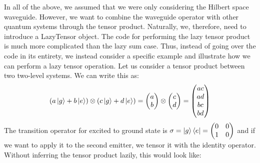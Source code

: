 In all of the above, we assumed that we were only considering the Hilbert space waveguide. However, we want to combine the waveguide operator with other quantum systems through the tensor product. Naturally, we, therefore, need to introduce a LazyTensor object. The code for performing the lazy tensor product is much more complicated than the lazy sum case. Thus, instead of going over the code in its entirety, we instead consider a specific example and illustrate how we can perform a lazy tensor operation. Let us consider a tensor product between two two-level systems. We can write this as:
\begin{equation}
    \left (a\ket{g}+b\ket{e} \right ) \otimes \left(c\ket{g}+d\ket{e} \right) =  \begin{pmatrix} {a} \\ {b} \end{pmatrix} \otimes \begin{pmatrix} {c} \\ {d} \end{pmatrix} = \begin{pmatrix} {a}{c} \\ {a} {d} \\ {b}{c} \\ {b}{d} \end{pmatrix}
\end{equation}
The transition operator for excited to ground state is $\sigma = \ket{g}\bra{e} = \begin{pmatrix}
    0 & 0 \\ 1 & 0
\end{pmatrix}$ and if we want to apply it to the second emitter, we tensor it with the identity operator. Without inferring the tensor product lazily, this would look like:
